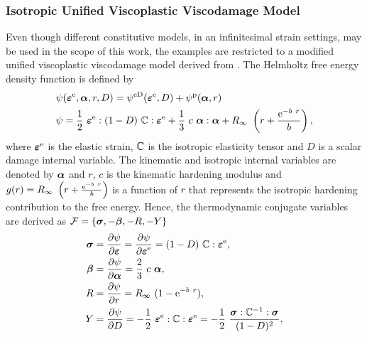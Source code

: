 \subsubsection{Isotropic Unified Viscoplastic Viscodamage Model}
\label{damagemodel}
Even though different constitutive models, in an infinitesimal strain settings, may be used in the scope of this work, the examples are restricted to a modified unified viscoplastic viscodamage model derived from \parencite{lemaitre2005engineering,chaboche1989unified,de2011computational}. The Helmholtz free energy density function is defined by
\begin{align}
	 & \psi(\mbox{$\bm \varepsilon $}^{\rm{e}},\mbox{$\bm \alpha$},r,D) = \psi^{\mathrm{eD}}(\mbox{$\bm \varepsilon $}^{\rm{e}},D) + \psi^{\mathrm{p}}(\mbox{$\bm \alpha$},r)                                                                                                                                                                     \\
	 & \psi = \frac{1}{2} \  \mbox{$\bm \varepsilon $}^{\rm{e}} : (1-D) \  {\mathbb{ C}} : \mbox{$\bm \varepsilon $}^{\rm{e}} +  \frac{1}{3} \  c \  \mbox{$\bm \alpha$} : \mbox{$\bm \alpha$} + R_\infty \  \left(r+\frac{\mathrm{e}^{-b\  r}}{b}\right),
	\label{eq:free_energy_damage}
\end{align}
where $\mbox{$\bm \varepsilon $}^{\rm{e}}$ is the elastic strain, ${\mathbb{ C}}$ is the isotropic elasticity tensor and $D$ is a scalar damage internal variable. The kinematic and isotropic internal variables are denoted by  $\mbox{$\bm \alpha$}$ and $r$, $c$ is the kinematic hardening modulus and $g(r) = R_\infty \  \left(r+\frac{\mathrm{e}^{-b\  r}}{b}\right)$ is a function of $r$ that represents the isotropic hardening contribution to the free energy. Hence, the thermodynamic conjugate variables are derived as ${\cal F}=\{\mbox{$\bm \sigma$},-\mbox{$\bm \beta$},-R,-Y\}$ \parencite{de2011computational}
\begin{equation}
	\begin{split}
		\mbox{$\bm \sigma$} &=\displaystyle\frac{\displaystyle\partial \psi}{\displaystyle\partial \mbox{$\bm \varepsilon $}}=\displaystyle\frac{\displaystyle\partial \psi}{\displaystyle\partial \mbox{$\bm \varepsilon $}^{\rm{e}}}= (1-D) \  {\mathbb{ C}} : \mbox{$\bm \varepsilon $}^{\rm{e}} , \\
		\mbox{$\bm \beta$} &= \displaystyle\frac{\displaystyle\partial \psi}{\displaystyle\partial \mbox{$\bm \alpha$}}= \frac{2}{3} \   c \   \mbox{$\bm \alpha$} ,\\
		R & = \displaystyle\frac{\displaystyle\partial \psi}{\displaystyle\partial r} = R_\infty \  (1-\mathrm{e}^{-b\  r}),\\
		Y & = \displaystyle\frac{\displaystyle\partial \psi}{\displaystyle\partial D} = - \frac{1}{2} \   \mbox{$\bm \varepsilon $}^{\rm{e}} :  {\mathbb{ C}} :  \mbox{$\bm \varepsilon $}^{\rm{e}} = - \frac{1}{2} \  \frac{\mbox{$\bm \sigma$} : {\mathbb{ C}}^{-1} : \mbox{$\bm \sigma$}}{ (1-D)^2},
	\end{split}
	\label{eq_state_eq}
\end{equation}
